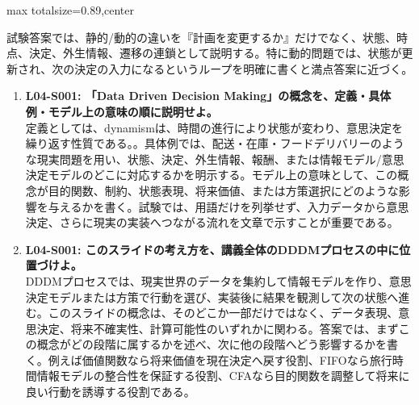 \begin{minipage}[t]{0.58\textwidth}
\begin{adjustbox}{max totalsize={\textwidth}{0.89\textheight},center}
\begin{minipage}{\textwidth}
試験答案では、静的/動的の違いを『計画を変更するか』だけでなく、状態、時点、決定、外生情報、遷移の連鎖として説明する。特に動的問題では、状態が更新され、次の決定の入力になるというループを明確に書くと満点答案に近づく。\par{}\begin{enumerate}\item \textbf{L04-S001: 「Data Driven Decision Making」の概念を、定義・具体例・モデル上の意味の順に説明せよ。}\\定義としては、dynamismは、時間の進行により状態が変わり、意思決定を繰り返す性質である。。具体例では、配送・在庫・フードデリバリーのような現実問題を用い、状態、決定、外生情報、報酬、または情報モデル/意思決定モデルのどこに対応するかを明示する。モデル上の意味として、この概念が目的関数、制約、状態表現、将来価値、または方策選択にどのような影響を与えるかを書く。試験では、用語だけを列挙せず、入力データから意思決定、さらに現実の実装へつながる流れを文章で示すことが重要である。\item \textbf{L04-S001: このスライドの考え方を、講義全体のDDDMプロセスの中に位置づけよ。}\\DDDMプロセスでは、現実世界のデータを集約して情報モデルを作り、意思決定モデルまたは方策で行動を選び、実装後に結果を観測して次の状態へ進む。このスライドの概念は、そのどこか一部だけではなく、データ表現、意思決定、将来不確実性、計算可能性のいずれかに関わる。答案では、まずこの概念がどの段階に属するかを述べ、次に他の段階へどう影響するかを書く。例えば価値関数なら将来価値を現在決定へ戻す役割、FIFOなら旅行時間情報モデルの整合性を保証する役割、CFAなら目的関数を調整して将来に良い行動を誘導する役割である。\end{enumerate}
\end{minipage}
\end{adjustbox}
\end{minipage}


